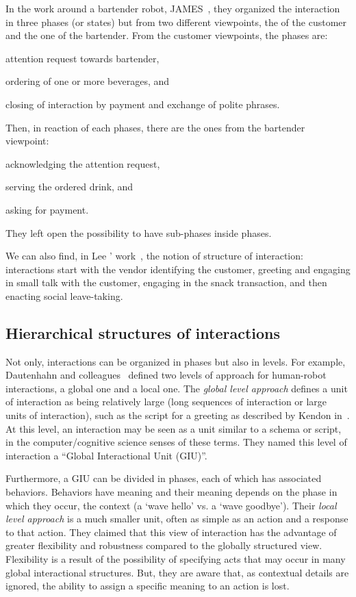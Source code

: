 \documentclass[a4paper,11pt,twoside]{StyleThese}
\begin{document}
In the work around a bartender robot, JAMES~\cite{gaschler_2012_modelling}, they organized the interaction in three phases (or states) but from two different viewpoints, the of the customer and the one of the bartender. From the customer viewpoints, the phases are: 
\begin{inlineEnumerate}
	\item attention request towards bartender,
	\item ordering of one or more beverages, and
	\item closing of interaction by payment and exchange of polite phrases.
\end{inlineEnumerate} Then, in reaction of each phases, there are the ones from the bartender viewpoint:
\begin{inlineEnumerate}
	\item acknowledging the attention request,
	\item serving the ordered drink, and
	\item asking for payment.
\end{inlineEnumerate}
They left open the possibility to have sub-phases inside phases.

We can also find, in Lee \etal{}' work~\cite{lee_2012_personalization}, the notion of structure of interaction: interactions start with the vendor identifying the customer, greeting and engaging in small talk with the customer, engaging in the snack transaction, and then enacting social leave-taking.

\subsection{Hierarchical structures of interactions}\label{chap2:subsec:inter_hier}
Not only, interactions can be organized in phases but also in levels. For example, Dautenhahn and colleagues~\cite{dautenhahn_2002_embodied, ogden_2001_interactional} defined two levels of approach for human-robot interactions, a global one and a local one. The \emph{global level approach} defines a unit of interaction as being relatively large (long sequences of interaction or large units of interaction), such as the script for a greeting as described by Kendon in~\cite{kendon_1990_conducting}. At this level, an interaction may be seen as a unit similar to a schema or script, in the computer/cognitive science senses of these terms. They named this level of interaction a ``Global Interactional Unit (GIU)''. 

Furthermore, a GIU can be divided in phases, each of which has associated behaviors. Behaviors have meaning and their meaning depends on the phase in which they occur, the context (\eg a ‘wave hello’ vs. a ‘wave goodbye’). Their \emph{local level approach} is a much smaller unit, often as simple as an action and a response to that action. They claimed that this view of interaction has the advantage of greater flexibility and robustness compared to the globally structured view. Flexibility is a result of the possibility of specifying acts that may occur in many global interactional structures. But, they are aware that, as contextual details are ignored, the ability to assign a specific meaning to an action is lost.
\end{document}
